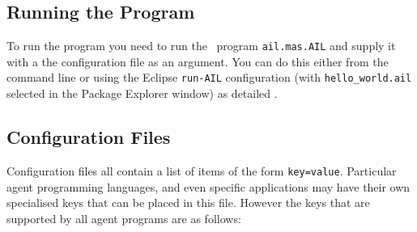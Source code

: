 \subsection{Running the Program}

To run the program you need to run the \java\ program \texttt{ail.mas.AIL} and supply it with a the configuration file as an argument.  You can do this either from the command line or using the Eclipse \texttt{run-AIL} configuration (with \texttt{hello\_world.ail} selected in the Package Explorer window) as detailed .

\subsection{Configuration Files}
\label{sec:configuration}

Configuration files all contain a list of items of the form \texttt{key=value}.  Particular agent programming languages, and even specific applications may have their own specialised keys that can be placed in this file.  However the keys that are supported by all agent programs are as follows:

